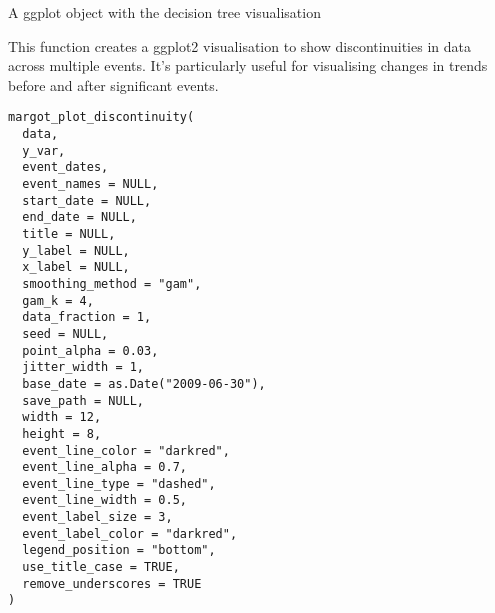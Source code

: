 \documentclass[a4paper]{book}
\begin{document}
%
\begin{Value}
A ggplot object with the decision tree visualisation
\end{Value}
%
\begin{Description}
This function creates a ggplot2 visualisation to show discontinuities in data across multiple events.
It's particularly useful for visualising changes in trends before and after significant events.
\end{Description}
%
\begin{Usage}
\begin{verbatim}
margot_plot_discontinuity(
  data,
  y_var,
  event_dates,
  event_names = NULL,
  start_date = NULL,
  end_date = NULL,
  title = NULL,
  y_label = NULL,
  x_label = NULL,
  smoothing_method = "gam",
  gam_k = 4,
  data_fraction = 1,
  seed = NULL,
  point_alpha = 0.03,
  jitter_width = 1,
  base_date = as.Date("2009-06-30"),
  save_path = NULL,
  width = 12,
  height = 8,
  event_line_color = "darkred",
  event_line_alpha = 0.7,
  event_line_type = "dashed",
  event_line_width = 0.5,
  event_label_size = 3,
  event_label_color = "darkred",
  legend_position = "bottom",
  use_title_case = TRUE,
  remove_underscores = TRUE
)
\end{verbatim}
\end{Usage}
%
\end{document}
